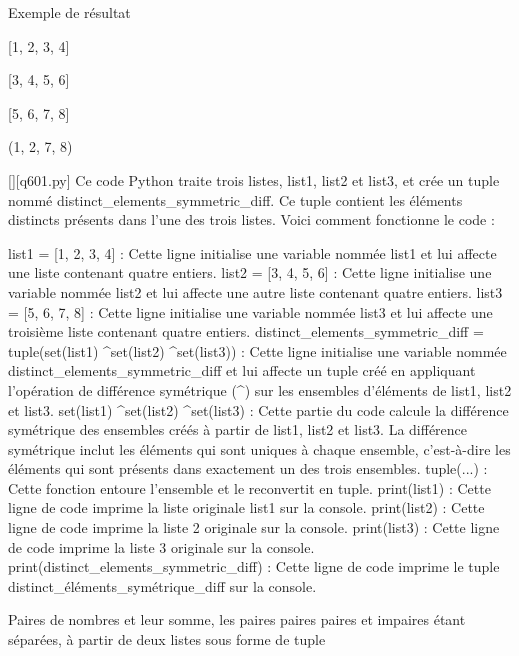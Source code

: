Exemple de résultat

[1, 2, 3, 4]

[3, 4, 5, 6]

[5, 6, 7, 8]

(1, 2, 7, 8)
        \par
        \begin{solution}
            \renewcommand{\nomfichier}{q601.py}
            \pythonfile{\chemincode \nomfichier}[][\nomfichier]
            Ce code Python traite trois listes, list1, list2 et list3, et crée un tuple nommé distinct\_elements\_symmetric\_diff. Ce tuple contient les éléments distincts présents dans l'une des trois listes. Voici comment fonctionne le code :

    list1 = [1, 2, 3, 4] : Cette ligne initialise une variable nommée list1 et lui affecte une liste contenant quatre entiers.
    list2 = [3, 4, 5, 6] : Cette ligne initialise une variable nommée list2 et lui affecte une autre liste contenant quatre entiers.
    list3 = [5, 6, 7, 8] : Cette ligne initialise une variable nommée list3 et lui affecte une troisième liste contenant quatre entiers.
    distinct\_elements\_symmetric\_diff = tuple(set(list1) \textasciicircum set(list2) \textasciicircum set(list3)) : Cette ligne initialise une variable nommée distinct\_elements\_symmetric\_diff et lui affecte un tuple créé en appliquant l'opération de différence symétrique (\textasciicircum) sur les ensembles d'éléments de list1, list2 et list3.
        set(list1) \textasciicircum set(list2) \textasciicircum set(list3) : Cette partie du code calcule la différence symétrique des ensembles créés à partir de list1, list2 et list3. La différence symétrique inclut les éléments qui sont uniques à chaque ensemble, c'est-à-dire les éléments qui sont présents dans exactement un des trois ensembles.
        tuple(...) : Cette fonction entoure l'ensemble et le reconvertit en tuple.
    print(list1) : Cette ligne de code imprime la liste originale list1 sur la console.
    print(list2) : Cette ligne de code imprime la liste 2 originale sur la console.
    print(list3) : Cette ligne de code imprime la liste 3 originale sur la console.
    print(distinct\_elements\_symmetric\_diff) : Cette ligne de code imprime le tuple distinct\_éléments\_symétrique\_diff sur la console.
        \end{solution}
        

        \question
        Paires de nombres et leur somme, les paires paires paires et impaires étant séparées, à partir de deux listes sous forme de tuple

